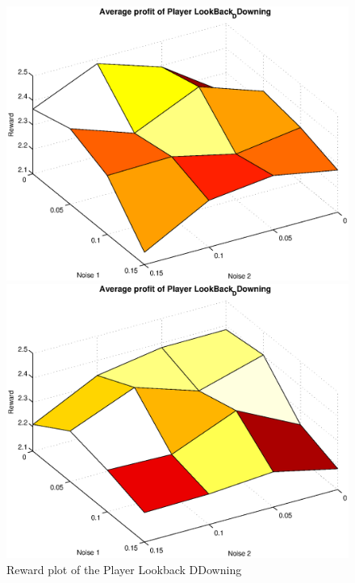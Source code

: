 \begin{figure}[h]

\begin{minipage}[hbt]{0.65\textwidth}
	\centering
	\includegraphics[width=\textwidth]{pics/simulation1/Reward_vs_Noise_of_Player_LookBack_DDowning}
\end{minipage}
\hfill
\begin{minipage}[hbt]{0.3\textwidth}
	\centering
	\includegraphics[width=\textwidth]{pics/simulation2/Reward_vs_Noise_of_Player_LookBack_DDowning}
\end{minipage}
	\caption{Reward plot of the Player Lookback DDowning}
	\label{pic player lbdd}
\end{figure}


